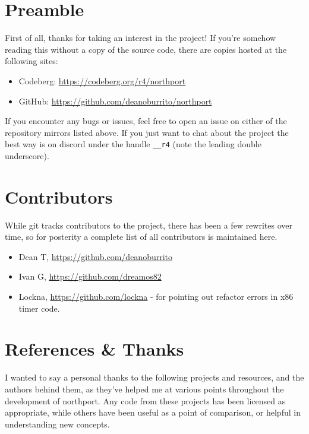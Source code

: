 \section{Preamble}
First of all, thanks for taking an interest in the project! If you're somehow reading this without a copy of the source code, there are copies hosted at the following sites:

\begin{itemize}
    \item Codeberg: \url{https://codeberg.org/r4/northport}
    \item GitHub: \url{https://github.com/deanoburrito/northport}
\end{itemize}

If you encounter any bugs or issues, feel free to open an issue on either of the repository mirrors listed above. If you just want to chat about the project the best way is on discord under the handle \verb|__r4| (note the leading double underscore).

\section{Contributors}
While git tracks contributors to the project, there has been a few rewrites over time, so for posterity a complete list of all contributors is maintained here. 

\begin{itemize}
    \item Dean T, \url{https://github.com/deanoburrito}
    \item Ivan G, \url{https://github.com/dreamos82}
    \item Lockna, \url{https://github.com/lockna} - for pointing out refactor errors in x86 timer code.
\end{itemize}

\section{References \& Thanks}
I wanted to say a personal thanks to the following projects and resources, and the authors behind them, as they've helped me at various points throughout the development of northport. Any code from these projects has been licensed as appropriate, while others have been useful as a point of comparison, or helpful in understanding new concepts.

